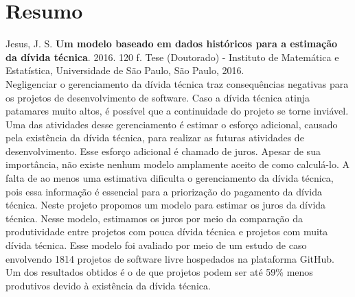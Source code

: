 \documentclass[11pt,twoside,a4paper]{book}
\begin{document}





\chapter*{Resumo}

\noindent Jesus, J. S. \textbf{Um modelo baseado em dados históricos para a estimação da dívida técnica}. 
2016. 120 f.
Tese (Doutorado) - Instituto de Matemática e Estatística,
Universidade de São Paulo, São Paulo, 2016.
\\
Negligenciar o gerenciamento da dívida técnica traz consequências negativas para os projetos de desenvolvimento de software. Caso a dívida técnica atinja patamares muito altos, é possível que a continuidade do projeto se torne inviável.
Uma das atividades desse gerenciamento é estimar o esforço adicional, causado pela existência da dívida técnica, para realizar as futuras atividades de desenvolvimento. Esse esforço adicional é chamado de juros. Apesar de sua importância, não existe nenhum modelo amplamente aceito de como calculá-lo. A falta de ao menos uma estimativa dificulta o gerenciamento da dívida técnica, pois essa informação é essencial para a priorização do pagamento da dívida técnica.
Neste projeto propomos um modelo para estimar os juros da dívida técnica. Nesse modelo, estimamos os juros por meio da comparação da produtividade entre projetos com pouca dívida técnica e projetos com muita dívida técnica. Esse modelo foi avaliado por meio de um estudo de caso envolvendo 1814 projetos de software livre hospedados na plataforma GitHub. Um dos resultados obtidos é o de que projetos podem ser até 59\% menos produtivos devido à existência da dívida técnica. 
\\
\end{document}
